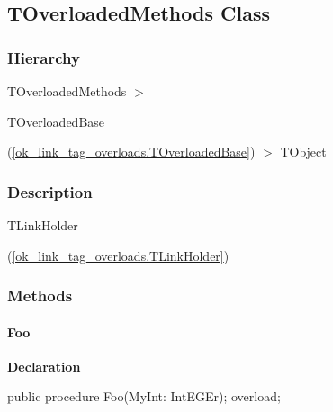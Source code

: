 \documentclass{report}
\newif\ifpdf
\begin{document}
\subsection*{TOverloadedMethods Class}
\fi
\label{ok_link_tag_overloads.TOverloadedMethods}
\subsubsection*{\large{\textbf{Hierarchy}}\normalsize\hspace{1ex}\hfill}
TOverloadedMethods {$>$} \begin{ttfamily}TOverloadedBase\end{ttfamily}(\ref{ok_link_tag_overloads.TOverloadedBase}) {$>$} 
TObject
\subsubsection*{\large{\textbf{Description}}\normalsize\hspace{1ex}\hfill}
\begin{ttfamily}TLinkHolder\end{ttfamily}(\ref{ok_link_tag_overloads.TLinkHolder})\subsubsection*{\large{\textbf{Methods}}\normalsize\hspace{1ex}\hfill}
\paragraph*{Foo}\hspace*{\fill}

\label{ok_link_tag_overloads.TOverloadedMethods-Foo}
\begin{list}{}{
\setlength{\itemindent}{0cm}
\setlength{\listparindent}{0cm}
\setlength{\leftmargin}{\evensidemargin}
\addtolength{\leftmargin}{\tmplength}
\settowidth{\labelsep}{X}
\addtolength{\leftmargin}{\labelsep}
\setlength{\labelwidth}{\tmplength}
}
\item[\textbf{Declaration}\hfill]
\ifpdf
\begin{flushleft}
\fi
\begin{ttfamily}
public procedure Foo(MyInt: IntEGEr); overload;\end{ttfamily}

\ifpdf
\end{flushleft}
\fi

\end{list}
\end{document}
